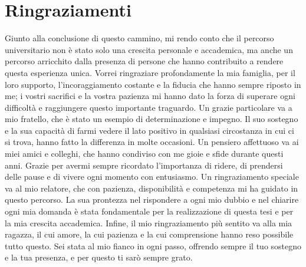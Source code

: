 \documentclass[12pt, a4paper, italian]{report}
\numberwithin{figure}{chapter}
\numberwithin{table}{chapter}
\begin{document}
\chapter*{Ringraziamenti}
Giunto alla conclusione di questo cammino, mi rendo conto che il percorso universitario non è stato solo una crescita personale e accademica, ma anche un percorso arricchito dalla presenza di persone che hanno contribuito a rendere questa esperienza unica.
Vorrei ringraziare profondamente la mia famiglia, per il loro supporto, l'incoraggiamento costante e la fiducia che hanno sempre riposto in me; i vostri sacrifici e la vostra pazienza mi hanno dato la forza di superare ogni difficoltà e raggiungere questo importante traguardo.
Un grazie particolare va a mio fratello, che è stato un esempio di determinazione e impegno. Il suo sostegno e la sua capacità di farmi vedere il lato positivo in qualsiasi circostanza in cui ci si trova, hanno fatto la differenza in molte occasioni.
Un pensiero affettuoso va ai miei amici e colleghi, che hanno condiviso con me gioie e sfide durante questi anni. Grazie per avermi sempre ricordato l'importanza di ridere, di prendersi delle pause e di vivere ogni momento con entusiasmo.
Un ringraziamento speciale va al mio relatore, che con pazienza, disponibilità e competenza mi ha guidato in questo percorso. La sua prontezza nel rispondere a ogni mio dubbio e nel chiarire ogni mia domanda è stata fondamentale per la realizzazione di questa tesi e per la mia crescita accademica.
Infine, il mio ringraziamento più sentito va alla mia ragazza, il cui amore, la cui pazienza e la cui comprensione hanno reso possibile tutto questo. Sei stata al mio fianco in ogni passo, offrendo sempre il tuo sostegno e la tua presenza, e per questo ti sarò sempre grato.

\printbibliography[title={Bibliografia}]
\end{document}
